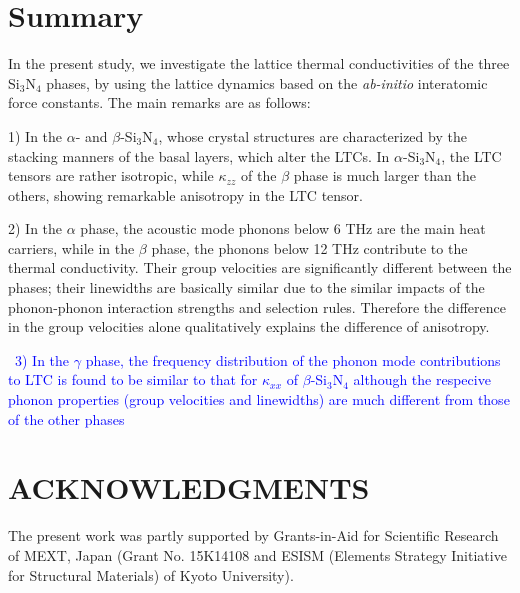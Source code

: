\documentclass[twocolumn,amsmath,amssymb,a4paper,prb,superscriptaddress,floatfix]{revtex4-1}
\begin{document}

\section{Summary}

In the present study, we investigate the lattice thermal conductivities of the
three Si$_3$N$_4$ phases, by using the lattice dynamics based on the {\it
ab-initio} interatomic force constants. The main remarks are as follows:

1) In the $\alpha$- and $\beta$-Si$_3$N$_4$, whose crystal structures are
characterized by the stacking manners of the basal layers, which alter the
LTCs. In $\alpha$-Si$_3$N$_4$, the LTC tensors are rather isotropic, while
$\kappa$$_{zz}$ of the $\beta$ phase is much larger than the others, showing
remarkable anisotropy in the LTC tensor. 

2) In the $\alpha$ phase, the acoustic mode phonons below 6 THz are the main
heat carriers, while in the $\beta$ phase, the phonons below 12 THz contribute
to the thermal conductivity. Their group velocities are significantly different
between the phases; their linewidths are basically similar due to the similar
impacts of the phonon-phonon interaction strengths and selection rules.
Therefore the difference in the group velocities alone qualitatively explains
the difference of anisotropy.

~\textcolor{blue}{3) In the $\gamma$ phase, the frequency distribution of the
phonon mode contributions to LTC is found to be similar to that for
$\kappa$$_{xx}$ of $\beta$-Si$_3$N$_4$ although the respecive phonon properties 
(group velocities and linewidths) are much different from those of the other phases}

\section*{ACKNOWLEDGMENTS}
The present work was partly supported by Grants-in-Aid for Scientific
Research of MEXT, Japan (Grant No. 15K14108 and ESISM (Elements Strategy
Initiative for Structural Materials) of Kyoto University).

\appendix
\end{document}

